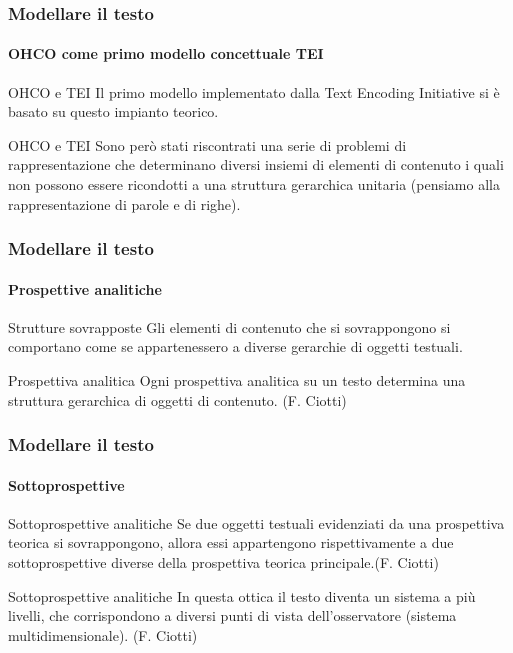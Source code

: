 \begin{frame}
	\frametitle{Modellare il testo}
	\framesubtitle{OHCO come primo modello concettuale TEI}
	\addtocounter{nframe}{1}

	\begin{block}{OHCO e TEI}
		Il primo modello implementato dalla Text Encoding Initiative si è basato su questo impianto teorico.
	\end{block}

	\begin{block}{OHCO e TEI}
		Sono però stati riscontrati una serie di problemi di rappresentazione che determinano diversi insiemi di elementi di contenuto i quali non possono essere ricondotti a una struttura gerarchica unitaria (pensiamo alla rappresentazione di parole e di righe).
	\end{block}

\end{frame}

\begin{frame}
	\frametitle{Modellare il testo}
	\framesubtitle{Prospettive analitiche}
	\addtocounter{nframe}{1}

	\begin{block}{Strutture sovrapposte}
		Gli elementi di contenuto che si sovrappongono si comportano come se appartenessero a diverse gerarchie di oggetti testuali.
	\end{block}

	\begin{block}{Prospettiva analitica}
		Ogni prospettiva analitica su un testo determina una struttura gerarchica di oggetti di contenuto. (F. Ciotti)
	\end{block}
\end{frame}

\begin{frame}
	\frametitle{Modellare il testo}
	\framesubtitle{Sottoprospettive}
	\addtocounter{nframe}{1}

	\begin{block}{Sottoprospettive analitiche}
		Se due oggetti testuali evidenziati da una prospettiva teorica si sovrappongono, allora essi appartengono rispettivamente a due sottoprospettive diverse della prospettiva teorica principale.(F. Ciotti)
	\end{block}

	\begin{block}{Sottoprospettive analitiche}
		In questa ottica il testo diventa un sistema a più livelli, che corrispondono a diversi punti di vista dell’osservatore (sistema multidimensionale). (F. Ciotti)
	\end{block}

\end{frame}

